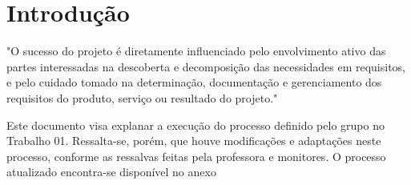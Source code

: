 \chapter*[Introdução]{Introdução}

"O sucesso do projeto é diretamente influenciado pelo envolvimento ativo das partes interessadas na
descoberta e decomposição das necessidades em requisitos, e pelo cuidado tomado na determinação,
documentação e gerenciamento dos requisitos do produto, serviço ou resultado do projeto." \cite{pmbok}

Este documento visa explanar a execução do processo definido pelo grupo no Trabalho 01. Ressalta-se,
porém, que houve modificações e adaptações neste processo, conforme as ressalvas feitas pela professora e monitores.
O processo atualizado encontra-se disponível no anexo %
